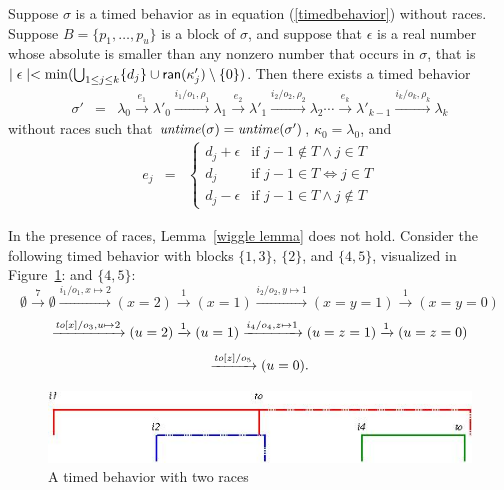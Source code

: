 \begin{lemma}
\label{wiggle lemma}
Suppose $\sigma$ is a timed behavior as in equation (\ref{timedbehavior}) without races.
Suppose $B = \{ p_1 ,\ldots, p_u \}$ is a block of $\sigma$, and suppose
that $\epsilon$ is a real number whose absolute is smaller than any nonzero number that occurs in $\sigma$, that is
$\mid \epsilon \mid  < \min (\bigcup_{1 \leq j \leq k} \{ d_j \} \cup {\textsf{ran}}(\kappa'_j) \setminus \{ 0 \} )$.
Then there exists a timed behavior
\begin{eqnarray*}
\sigma' & = & \lambda_0 \xrightarrow{e_1} \lambda'_0 \xrightarrow{i_1/o_1, \rho_1} \lambda_1 \xrightarrow{e_2} \lambda'_1 \xrightarrow{i_2/o_2, \rho_2} \lambda_2 \cdots
\xrightarrow{e_k} \lambda'_{k-1} \xrightarrow{i_k/o_k, \rho_k} \lambda_{k}
\end{eqnarray*}
without races such that
$\mathit{untime}(\sigma)=\mathit{untime}(\sigma')$,
$\kappa_0 = \lambda_0$, and
\begin{eqnarray*}
e_j & = & \left\{ \begin{array}{ll}
d_j + \epsilon & \mbox{if } j-1 \not\in T \wedge j \in T \\
d_j & \mbox{if } j-1 \in T \Leftrightarrow j \in T\\
d_j - \epsilon & \mbox{if } j-1 \in T \wedge j \not\in T
\end{array}\right.
\end{eqnarray*}
\end{lemma}
In the presence of races, Lemma~\ref{wiggle lemma} does not hold. 
Consider the following timed behavior with blocks $\{ 1, 3 \}$, $\{ 2 \}$,
\iflong 
and $\{ 4, 5 \}$, visualized in Figure~\ref{fig:races}:
\else
and $\{ 4, 5 \}$:
\fi
\[
\emptyset \xrightarrow{7} \emptyset \xrightarrow{i_1/o_1, x \mapsto 2} (x=2) \xrightarrow{1} (x=1)
\xrightarrow{i_2/o_2, y \mapsto 1} (x=y=1) \xrightarrow{1} (x=y=0) 
\]
\[
\xrightarrow{\mathit{to}[x]/o_3, u \mapsto 2} (u=2)
\xrightarrow{1} (u=1)
\xrightarrow{i_4/o_4, z \mapsto 1} (u=z=1)
\xrightarrow{1} (u=z=0)
\]
\[
\xrightarrow{\mathit{to}[z]/o_5} (u=0).
\]
\iflong
\begin{figure}
\vspace{-2em}
\begin{center}
\includegraphics[width=.8\textwidth]{wiggling.jpg}
\end{center}
\caption{A timed behavior with two races}
\label{fig:races}
\end{figure}
